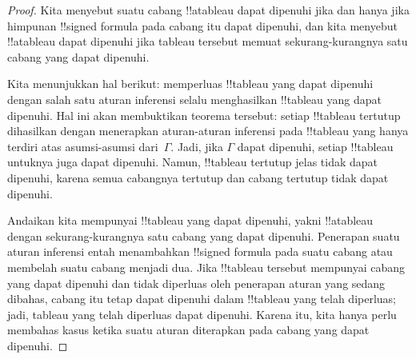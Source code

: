\documentclass[../../../include/open-logic-section]{subfiles}
\begin{document}
\begin{proof}
Kita menyebut suatu cabang !!a{tableau} dapat dipenuhi jika dan hanya jika
himpunan !!{signed formula} pada cabang itu dapat dipenuhi, dan kita
menyebut !!a{tableau} dapat dipenuhi jika tableau tersebut memuat
sekurang-kurangnya satu cabang yang dapat dipenuhi.

Kita menunjukkan hal berikut: memperluas !!{tableau} yang dapat dipenuhi
dengan salah satu aturan inferensi selalu menghasilkan !!{tableau} yang
dapat dipenuhi. Hal ini akan membuktikan teorema tersebut: setiap
!!{tableau} tertutup dihasilkan dengan menerapkan aturan-aturan inferensi
pada !!{tableau} yang hanya terdiri atas asumsi-asumsi dari~$\Gamma$. Jadi,
jika $\Gamma$ dapat dipenuhi, setiap !!{tableau} untuknya juga dapat
dipenuhi. Namun, !!{tableau} tertutup jelas tidak dapat dipenuhi, karena
semua cabangnya tertutup dan cabang tertutup tidak dapat dipenuhi.

Andaikan kita mempunyai !!{tableau} yang dapat dipenuhi, yakni !!a{tableau}
dengan sekurang-kurangnya satu cabang yang dapat dipenuhi. Penerapan suatu
aturan inferensi entah menambahkan !!{signed formula} pada suatu cabang atau
membelah suatu cabang menjadi dua. Jika !!{tableau} tersebut mempunyai
cabang yang dapat dipenuhi dan tidak diperluas oleh penerapan aturan yang
sedang dibahas, cabang itu tetap dapat dipenuhi dalam !!{tableau} yang telah
diperluas; jadi, tableau yang telah diperluas dapat dipenuhi. Karena itu,
kita hanya perlu membahas kasus ketika suatu aturan diterapkan pada cabang
yang dapat dipenuhi.


\end{proof}
\end{document}

